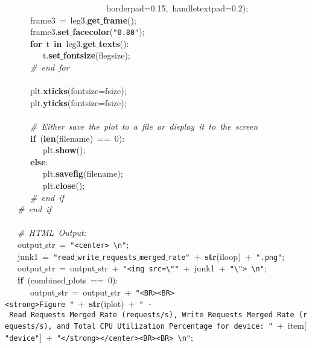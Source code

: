 \mbox{}\ \ \ \ \ \ \ \ \ \ \ \ \ \ \ \ \ \ \ \ \ \ \ \ borderpad=0.15,\ handletextpad=0.2); \\
\mbox{}\ \ \ \ \ \ frame3\ =\ leg3.\textbf{get$\_$frame}(); \\
\mbox{}\ \ \ \ \ \ frame3.\textbf{set$\_$facecolor}(\texttt{"{}0.80"{}}); \\
\mbox{}\ \ \ \ \ \ \textbf{for}\ t\ \textbf{in}\ leg3.\textbf{get$\_$texts}(): \\
\mbox{}\ \ \ \ \ \ \ \ \ t.\textbf{set$\_$fontsize}(flegsize); \\
\mbox{}\ \ \ \ \ \ \textit{\#\ end\ for} \\
\mbox{}\ \ \ \ \ \  \\
\mbox{}\ \ \ \ \ \ plt.\textbf{xticks}(fontsize=fsize); \\
\mbox{}\ \ \ \ \ \ plt.\textbf{yticks}(fontsize=fsize); \\
\mbox{}\ \ \ \ \ \  \\
\mbox{}\ \ \ \ \ \ \textit{\#\ Either\ save\ the\ plot\ to\ a\ file\ or\ display\ it\ to\ the\ screen} \\
\mbox{}\ \ \ \ \ \ \textbf{if}\ (\textbf{len}(filename)\ ==\ 0): \\
\mbox{}\ \ \ \ \ \ \ \ \ plt.\textbf{show}(); \\
\mbox{}\ \ \ \ \ \ \textbf{else}: \\
\mbox{}\ \ \ \ \ \ \ \ \ plt.\textbf{savefig}(filename); \\
\mbox{}\ \ \ \ \ \ \ \ \ plt.\textbf{close}(); \\
\mbox{}\ \ \ \ \ \ \textit{\#\ end\ if} \\
\mbox{}\ \ \ \textit{\#\ end\ if} \\
\mbox{}\ \ \  \\
\mbox{}\ \ \ \textit{\#\ HTML\ Output:} \\
\mbox{}\ \ \ output$\_$str\ =\ \texttt{"{}\textless{}center\textgreater{}\ \textbackslash{}n"{}}; \\
\mbox{}\ \ \ junk1\ =\ \texttt{"{}read$\_$write$\_$requests$\_$merged$\_$rate"{}}\ +\ \textbf{str}(iloop)\ +\ \texttt{"{}.png"{}}; \\
\mbox{}\ \ \ output$\_$str\ =\ output$\_$str\ +\ \texttt{"{}\textless{}img\ src=\textbackslash{}"{}"{}}\ +\ junk1\ +\ \texttt{"{}\textbackslash{}"{}\textgreater{}\ \textbackslash{}n"{}}; \\
\mbox{}\ \ \ \textbf{if}\ (combined$\_$plots\ ==\ 0): \\
\mbox{}\ \ \ \ \ \ output$\_$str\ =\ output$\_$str\ +\ \texttt{"{}\textless{}BR\textgreater{}\textless{}BR\textgreater{}\textless{}strong\textgreater{}Figure\ "{}}\ +\ \textbf{str}(iplot)\ +\ \texttt{"{}\ -\ Read\ Requests\ Merged\ Rate\ (requests/s),\ Write\ Requests\ Merged\ Rate\ (requests/s),\ and\ Total\ CPU\ Utilization\ Percentage\ for\ device:\ "{}}\ +\ item[\texttt{"{}device"{}}]\ +\ \texttt{"{}\textless{}/strong\textgreater{}\textless{}/center\textgreater{}\textless{}BR\textgreater{}\textless{}BR\textgreater{}\ \textbackslash{}n"{}}; \\
